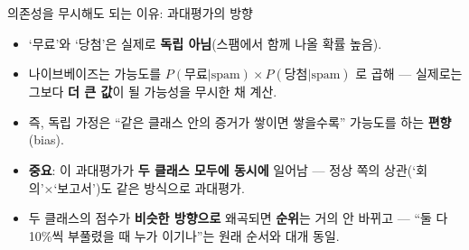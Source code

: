 \begin{frame}{의존성을 무시해도 되는 이유: 과대평가의 방향}
  \begin{itemize}
    \item `무료'와 `당첨'은 실제로 \textbf{독립 아님}(스팸에서 함께
      나올 확률 높음).
    \item 나이브베이즈는 가능도를
      $P(\text{무료}|\text{spam})\times P(\text{당첨}|\text{spam})$
      로 곱해 --- 실제로는 그보다 \textbf{더 큰 값}이 될 가능성을
      무시한 채 계산.
    \item 즉, 독립 가정은 ``같은 클래스 안의 증거가 쌓이면 쌓을수록''
      가능도를 하는 \textbf{편향}(bias).
    \item \textbf{중요}: 이 과대평가가 \textbf{두 클래스 모두에
      동시에} 일어남 --- 정상 쪽의 상관(`회의'×`보고서')도 같은
      방식으로 과대평가.
    \item 두 클래스의 점수가 \textbf{비슷한 방향으로} 왜곡되면
      \textbf{순위}는 거의 안 바뀌고 --- ``둘 다 10\%씩 부풀렸을 때
      누가 이기나''는 원래 순서와 대개 동일.
  \end{itemize}
\end{frame}
